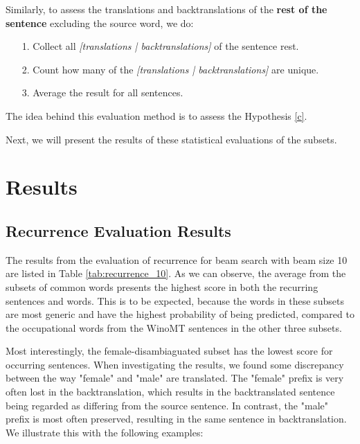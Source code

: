 Similarly, to assess the translations and backtranslations of the \textbf{rest of the sentence} excluding the source word, we do:
\begin{enumerate}
    \item[1. ] Collect all \textit{[translations | backtranslations]} of the sentence rest.
    \item[2. ] Count how many of the \textit{[translations | backtranslations]} are unique.
    \item[3. ] Average the result for all sentences.
\end{enumerate}

The idea behind this evaluation method is to assess the Hypothesis \ref{c}.

Next, we will present the results of these statistical evaluations of the subsets.

\section{Results}
\label{ch:Base_Experiment:Results}






\subsection{Recurrence Evaluation Results}
\label{ch:Base_Experiment:Results:Recurrence}

The results from the evaluation of recurrence for beam search with beam size 10 are listed in Table \ref{tab:recurrence_10}.
As we can observe, the average from the subsets of common words presents the highest score in both the recurring sentences and words. This is to be expected, because the words in these subsets are most generic and have the highest probability of being predicted, compared to the occupational words from the WinoMT sentences in the other three subsets. 

Most interestingly, the female-disambiaguated subset has the lowest score for occurring sentences. When investigating the results, we found some discrepancy between the way "female" and "male" are translated. The "female" prefix is very often lost in the backtranslation, which results in the backtranslated sentence being regarded as differing from the source sentence. In contrast, the "male" prefix is most often preserved, resulting in the same sentence in backtranslation. We illustrate this with the following examples:

